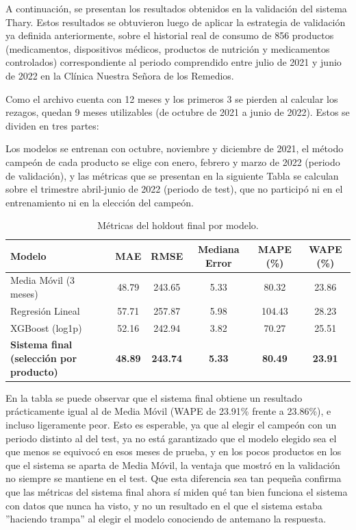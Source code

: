 A continuación, se presentan los resultados obtenidos en la validación del sistema Thary. Estos resultados se obtuvieron luego de aplicar la estrategia de validación ya definida anteriormente, sobre el historial real de consumo de 856 productos (medicamentos, dispositivos médicos, productos de nutrición y medicamentos controlados) correspondiente al periodo comprendido entre julio de 2021 y junio de 2022 en la Clínica Nuestra Señora de los Remedios.

Como el archivo cuenta con 12 meses y los primeros 3 se pierden al calcular los rezagos, quedan 9 meses utilizables (de octubre de 2021 a junio de 2022). Estos se dividen en tres partes: 

Los modelos se entrenan con octubre, noviembre y diciembre de 2021,  el método campeón de cada producto se elige con enero, febrero y marzo de 2022 (periodo de validación), y las métricas que se presentan en la siguiente Tabla se calculan sobre el trimestre abril-junio de 2022 (periodo de test), que no participó ni en el entrenamiento ni en la elección del campeón.

\begin{table}[H]
    \centering
    \caption{Métricas del holdout final por modelo.}
    \label{tab:resultados_holdout}
    \renewcommand{\arraystretch}{1.3}
    \begin{tabularx}{\textwidth}{|X|c|c|c|c|c|}
    \hline
    \textbf{Modelo} & \textbf{MAE} & \textbf{RMSE} & \textbf{Mediana Error} & \textbf{MAPE (\%)} & \textbf{WAPE (\%)} \\
    \hline
    Media Móvil (3 meses) & 48.79 & 243.65 & 5.33 & 80.32 & 23.86 \\
    \hline
    Regresión Lineal      & 57.71 & 257.87 & 5.98 & 104.43 & 28.23 \\
    \hline
    XGBoost (log1p)       & 52.16 & 242.94 & 3.82 & 70.27 & 25.51 \\
    \hline
    \textbf{Sistema final (selección por producto)} & \textbf{48.89} & \textbf{243.74} & \textbf{5.33} & \textbf{80.49} & \textbf{23.91} \\
    \hline
    \end{tabularx}
\end{table}

En la tabla se puede observar que el sistema final obtiene un resultado prácticamente igual al de Media Móvil (WAPE de 23.91\% frente a 23.86\%), e incluso ligeramente peor. Esto es esperable, ya que al elegir el campeón con un periodo distinto al del test, ya no está garantizado que el modelo elegido sea el que menos se equivocó en esos meses de prueba, y en los pocos productos en los que el sistema se aparta de Media Móvil, la ventaja que mostró en la validación no siempre se mantiene en el test. Que esta diferencia sea tan pequeña confirma que las métricas del sistema final ahora sí miden qué tan bien funciona el sistema con datos que nunca ha visto, y no un resultado en el que el sistema estaba ”haciendo trampa” al elegir el modelo conociendo de antemano la respuesta.

